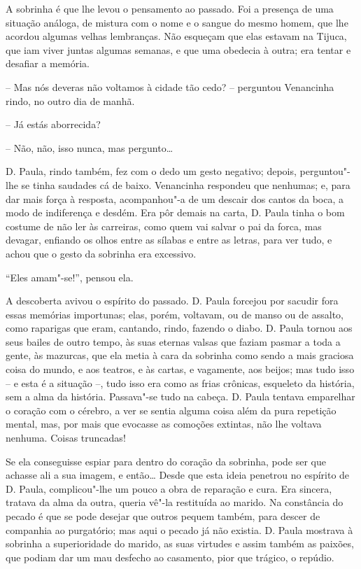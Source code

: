 A sobrinha é que lhe levou o pensamento ao passado. Foi a presença de
uma situação análoga, de mistura com o nome e o sangue do mesmo homem,
que lhe acordou algumas velhas lembranças. Não esqueçam que elas estavam
na Tijuca, que iam viver juntas algumas semanas, e que uma obedecia à
outra; era tentar e desafiar a memória.

-- Mas nós deveras não voltamos à cidade tão cedo? -- perguntou
Venancinha rindo, no outro dia de manhã.

-- Já estás aborrecida?

-- Não, não, isso nunca, mas pergunto\ldots{}

D. Paula, rindo também, fez com o dedo um gesto negativo; depois,
perguntou"-lhe se tinha saudades cá de baixo. Venancinha respondeu que
nenhumas; e, para dar mais força à resposta, acompanhou"-a de um descair
dos cantos da boca, a modo de indiferença e desdém. Era pôr demais na
carta, D. Paula tinha o bom costume de não ler às carreiras, como quem
vai salvar o pai da forca, mas devagar, enfiando os olhos entre as
sílabas e entre as letras, para ver tudo, e achou que o gesto da
sobrinha era excessivo.

``Eles amam"-se!'', pensou ela.

A descoberta avivou o espírito do passado. D. Paula forcejou por sacudir
fora essas memórias importunas; elas, porém, voltavam, ou de manso ou de
assalto, como raparigas que eram, cantando, rindo, fazendo o diabo. D.
Paula tornou aos seus bailes de outro tempo, às suas eternas valsas que
faziam pasmar a toda a gente, às mazurcas, que ela metia à cara da
sobrinha como sendo a mais graciosa coisa do mundo, e aos teatros, e às
cartas, e vagamente, aos beijos; mas tudo isso -- e esta é a situação
--, tudo isso era como as frias crônicas, esqueleto da história, sem a
alma da história. Passava"-se tudo na cabeça. D. Paula tentava emparelhar
o coração com o cérebro, a ver se sentia alguma coisa além da pura
repetição mental, mas, por mais que evocasse as comoções extintas, não
lhe voltava nenhuma. Coisas truncadas!

Se ela conseguisse espiar para dentro do coração da sobrinha, pode ser
que achasse ali a sua imagem, e então\ldots{} Desde que esta ideia penetrou
no espírito de D. Paula, complicou"-lhe um pouco a obra de reparação e
cura. Era sincera, tratava da alma da outra, queria vê"-la restituída ao
marido. Na constância do pecado é que se pode desejar que outros pequem
também, para descer de companhia ao purgatório; mas aqui o pecado já não
existia. D. Paula mostrava à sobrinha a superioridade do marido, as suas
virtudes e assim também as paixões, que podiam dar um mau desfecho ao
casamento, pior que trágico, o repúdio.

